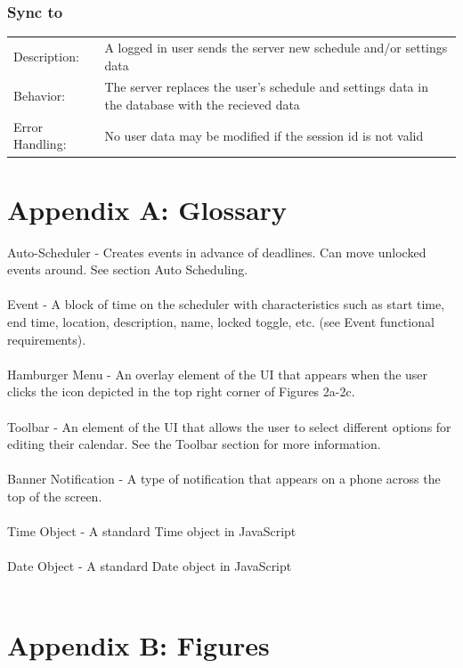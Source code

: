 \documentclass{scrreprt}
\begin{document}
\subsection{Sync to}
\begin{center}
\begin{tabular}{ p{2cm} p{13cm} }
Description: & A logged in user sends the server new schedule and/or settings data\\
Behavior: & The server replaces the user's schedule and settings data in the database with the recieved data\\
Error Handling: & No user data may be modified if the session id is not valid\\
\end{tabular}
\end{center}

\chapter{Appendix A: Glossary}
Auto-Scheduler - Creates events in advance of deadlines. Can move unlocked events around. See section Auto Scheduling.\\
\\
Event - A block of time on the scheduler with characteristics such as start time, end time,
location, description, name, locked toggle, etc. (see Event functional requirements).\\
\\
Hamburger Menu - An overlay element of the UI that appears when the user clicks the icon depicted in the top right corner of Figures 2a-2c.\\
\\
Toolbar - An element of the UI that allows the user to select different options for editing their calendar.  See the Toolbar section for more information. \\
\\
Banner Notification - A type of notification that appears on a phone across the top of the screen. \\
\\
Time Object - A standard Time object in JavaScript \\
\\
Date Object - A standard Date object in JavaScript \\
\\
\chapter{Appendix B: Figures}
\end{document}
